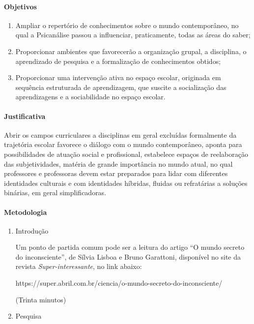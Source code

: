 \documentclass[12pt]{extarticle}
\begin{document}
{\paragraph{Objetivos}
\begin{enumerate}
\item
Ampliar o repertório de conhecimentos sobre o mundo contemporâneo, no
qual a Psicanálise passou a influenciar, praticamente, todas as áreas do
saber; 

\item
Proporcionar ambientes que favorecerão a organização grupal, a
disciplina, o aprendizado de pesquisa e a formalização de conhecimentos
obtidos; 

\item
Proporcionar uma intervenção ativa no espaço escolar,
originada em sequência estruturada de aprendizagem, que suscite a
socialização das aprendizagens e a sociabilidade no espaço escolar.
\end{enumerate}

\paragraph{Justificativa}
Abrir os campos curriculares a disciplinas em geral excluídas
formalmente da trajetória escolar favorece o diálogo com o mundo
contemporâneo, aponta para possibilidades de atuação social e
profissional, estabelece espaços de reelaboração das subjetividades,
matéria de grande importância no mundo atual, no qual professores e
professoras devem estar preparados para lidar com diferentes identidades
culturais e com identidades híbridas, fluidas ou refratárias a soluções
binárias, em geral simplificadoras.

\paragraph{Metodologia}
\begin{enumerate}
\item
Introdução

Um ponto de partida comum pode ser a leitura do artigo ``O mundo secreto
do inconsciente'', de Sílvia Lisboa e Bruno Garattoni, disponível no
site da revista \emph{Super-interessante}, no link abaixo:

https://super.abril.com.br/ciencia/o-mundo-secreto-do-inconsciente/

(Trinta minutos)

\item
Pesquisa


\end{enumerate}}
\end{document}
